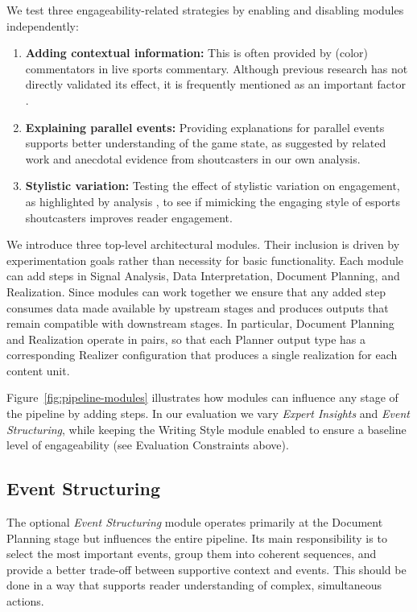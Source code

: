 We test three engageability-related strategies by enabling and disabling modules independently:
\begin{enumerate}
  \item \textbf{Adding contextual information:} This is often provided by (color) commentators in live sports commentary. Although previous research has not directly validated its effect, it is frequently mentioned as an important factor \cite{li2020, margetis2023}.
  \item \textbf{Explaining parallel events:} Providing explanations for parallel events supports better understanding of the game state, as suggested by related work \cite{cheung2011starcraft} and anecdotal evidence from shoutcasters in our own analysis.
  \item \textbf{Stylistic variation:} Testing the effect of stylistic variation on engagement, as highlighted by analysis \cite{lewandowski2012, byro2017, gustin2020}, to see if mimicking the engaging style of esports shoutcasters improves reader engagement.
\end{enumerate}

We introduce three top-level architectural modules. Their inclusion is driven by experimentation goals rather than necessity for basic functionality. Each module can add steps in Signal Analysis, Data Interpretation, Document Planning, and Realization. Since modules can work together we ensure that any added step consumes data made available by upstream stages and produces outputs that remain compatible with downstream stages. In particular, Document Planning and Realization operate in pairs, so that each Planner output type has a corresponding Realizer configuration that produces a single realization for each content unit.

Figure~\ref{fig:pipeline-modules} illustrates how modules can influence any stage of the pipeline by adding steps. In our evaluation we vary \textit{Expert Insights} and \textit{Event Structuring}, while keeping the Writing Style module enabled to ensure a baseline level of engageability (see Evaluation Constraints above).

\subsection{Event Structuring}
The optional \textit{Event Structuring} module operates primarily at the Document Planning stage but influences the entire pipeline. Its main responsibility is to select the most important events, group them into coherent sequences, and provide a better trade-off between supportive context and events. This should be done in a way that supports reader understanding of complex, simultaneous actions.

